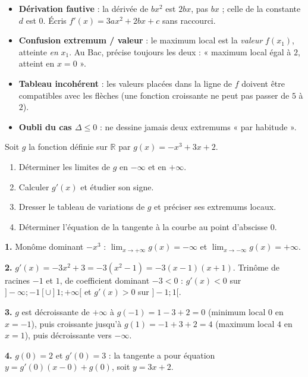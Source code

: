 \documentclass[11pt]{article}
\begin{document}
\begin{attention}
\begin{itemize}
\item \textbf{Dérivation fautive} : la dérivée de $bx^2$ est $2bx$, pas $bx$ ; celle de la constante $d$ est $0$. Écris $f'(x) = 3ax^2 + 2bx + c$ sans raccourci.
\item \textbf{Confusion extremum / valeur} : le maximum local est la \emph{valeur} $f(x_1)$, atteinte \emph{en} $x_1$. Au Bac, précise toujours les deux : « maximum local égal à $2$, atteint en $x = 0$ ».
\item \textbf{Tableau incohérent} : les valeurs placées dans la ligne de $f$ doivent être compatibles avec les flèches (une fonction croissante ne peut pas passer de $5$ à $2$).
\item \textbf{Oubli du cas $\Delta \leq 0$} : ne dessine jamais deux extremums « par habitude ».
\end{itemize}
\end{attention}

\begin{exercice}
Soit $g$ la fonction définie sur $\mathbb{R}$ par $g(x) = -x^3 + 3x + 2$.
\begin{enumerate}
\item Déterminer les limites de $g$ en $-\infty$ et en $+\infty$.
\item Calculer $g'(x)$ et étudier son signe.
\item Dresser le tableau de variations de $g$ et préciser ses extremums locaux.
\item Déterminer l'équation de la tangente à la courbe au point d'abscisse $0$.
\end{enumerate}
\end{exercice}

\begin{corrige}[Exercice 1]
\textbf{1.} Monôme dominant $-x^3$ : $\displaystyle\lim_{x \to +\infty} g(x) = -\infty$ et $\displaystyle\lim_{x \to -\infty} g(x) = +\infty$.

\textbf{2.} $g'(x) = -3x^2 + 3 = -3(x^2 - 1) = -3(x-1)(x+1)$. Trinôme de racines $-1$ et $1$, de coefficient dominant $-3 < 0$ : $g'(x) < 0$ sur $]-\infty ; -1[ \cup ]1 ; +\infty[$ et $g'(x) > 0$ sur $]-1 ; 1[$.

\textbf{3.} $g$ est décroissante de $+\infty$ à $g(-1) = 1 - 3 + 2 = 0$ (minimum local $0$ en $x = -1$), puis croissante jusqu'à $g(1) = -1 + 3 + 2 = 4$ (maximum local $4$ en $x = 1$), puis décroissante vers $-\infty$.

\textbf{4.} $g(0) = 2$ et $g'(0) = 3$ : la tangente a pour équation $y = g'(0)(x - 0) + g(0)$, soit $y = 3x + 2$.
\end{corrige}
\end{document}
